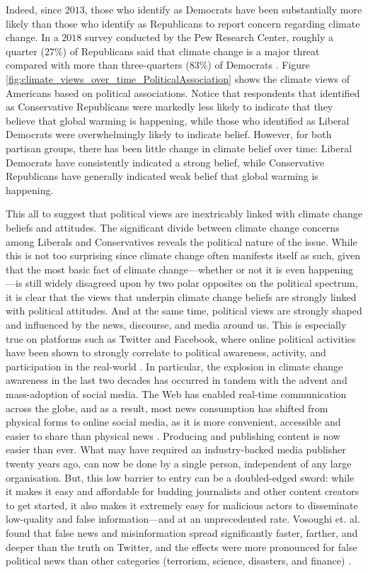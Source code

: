 \documentclass{paper}
\begin{document}
Indeed, since $2013$, those who identify as Democrats have been substantially more likely than those who identify as Republicans to report concern regarding climate change. In a $2018$ survey conducted by the Pew Research Center, roughly a quarter ($27\%$) of Republicans said that climate change is a major threat compared with more than three-quarters ($83\%$) of Democrats \cite{PRC:USPublicViewsOnClimateChangeAndEnergy}.  Figure \ref{fig:climate_views_over_time_PoliticalAssociation} shows the climate views of Americans based on political associations. Notice that respondents that identified as Conservative Republicans were markedly less likely to indicate that they believe that global warming is happening, while those who identified as Liberal Democrats were overwhelmingly likely to indicate belief. However, for both partisan groups, there has been little change in climate belief over time: Liberal Democrats have consistently indicated a strong belief, while Conservative Republicans have generally indicated weak belief that global warming is happening.

This all to suggest that political views are inextricably linked with climate change beliefs and attitudes. The significant divide between climate change concerns among Liberals and Conservatives reveals the political nature of the issue. While this is not too surprising since climate change often manifests itself as such, given that the most basic fact of climate change---whether or not it is even happening---is still widely disagreed upon by two polar opposites on the political spectrum, it is clear that the views that underpin climate change beliefs are strongly linked with political attitudes. And at the same time, political views are strongly shaped and influenced by the news, discourse, and media around us. This is especially true on platforms such as Twitter and Facebook, where online political activities have been shown to strongly correlate to political awareness, activity, and participation in the real-world \cite{Ahmad2019, PRC:PublicAttitudesTowardPoliticalEngagement}. In particular, the explosion in climate change awareness in the last two decades has occurred in tandem with the advent and mass-adoption of social media. The Web has enabled real-time communication across the globe, and as a result, most news consumption has shifted from physical forms to online social media, as it is more convenient, accessible and easier to share than physical news \cite{pierri2020false, PRC:NewsUse}. Producing and publishing content is now easier than ever. What may have required an industry-backed media publisher twenty years ago, can now be done by a single person, independent of any large organisation. But, this low barrier to entry can be a doubled-edged sword: while it makes it easy and affordable for budding journalists and other content creators to get started, it also makes it extremely easy for malicious actors to disseminate low-quality and false information---and at an unprecedented rate. Vosoughi et. al. found that false news and misinformation spread significantly faster, farther, and deeper than the truth on Twitter, and the effects were more pronounced for false political news than other categories (terrorism, science, disasters, and finance) \cite{Vosoughi2018}.
\end{document}
